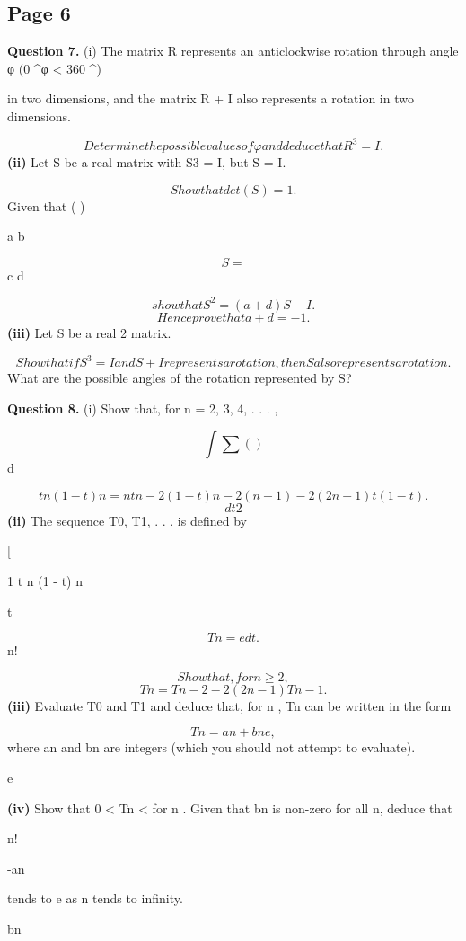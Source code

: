 \documentclass[12pt]{article}
\begin{document}
\subsection*{Page 6}
\begin{flushleft}
\bigskip\textbf{Question 7.} (i) The matrix R represents an anticlockwise rotation through angle φ (0 \textasciicircum{}\circ \leq φ < 360 \textasciicircum{}\circ )\par
in two dimensions, and the matrix R + I also represents a rotation in two dimensions.\par
\[Determine the possible values of φ and deduce that R^3 = I.\]
\textbf{(ii)} Let S be a real matrix with S3 = I, but S \sum= I.\par
\[Show that det(S) = 1.\]
Given that ( )\par
a b\par
\[S =\]
c d\par
\[show that S^2 = (a + d)S - I.\]
\[Hence prove that a + d = -1.\]
\textbf{(iii)} Let S be a real 2  matrix.\par
\[Show that if S^3 = I and S + I represents a rotation, then S also represents a rotation.\]
What are the possible angles of the rotation represented by S?\par
\bigskip\textbf{Question 8.} (i) Show that, for n = 2, 3, 4, . . . ,\par
\[\int \sum ( )\]
d\par
\[t n (1 - t) n = nt n-2 (1 - t) n-2 (n - 1) - 2(2n - 1)t(1 - t) .\]
\[dt2\]
\textbf{(ii)} The sequence T0, T1, . . . is defined by\par
[\par
1 t n (1 - t) n\par
t\par
\[Tn = e dt .\]
n!\par
\[Show that, for n \geq 2,\]
\[Tn = Tn-2 - 2(2n - 1)Tn-1 .\]
\textbf{(iii)} Evaluate T0 and T1 and deduce that, for n , Tn can be written in the form\par
\[Tn = an + bne ,\]
where an and bn are integers (which you should not attempt to evaluate).\par
e\par
\textbf{(iv)} Show that 0 < Tn < for n . Given that bn is non-zero for all n, deduce that\par
n!\par
-an\par
tends to e as n tends to infinity.\par
bn\par
\end{flushleft}
\end{document}
